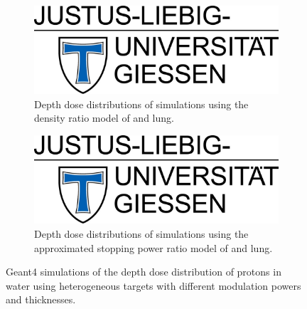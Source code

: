 \documentclass{article}
\begin{document}
\begin{figure}[h]
    \centering
    \begin{subfigure}[b]{0.49\textwidth}
        \centering
        \includegraphics[width=\textwidth]{fig/jlu.png}
        \caption{Depth dose distributions of simulations using the density ratio model of  and lung.}
        \label{fig:sim1}
    \end{subfigure}
    \hfill
    \begin{subfigure}[b]{0.49\textwidth}
        \centering
        \includegraphics[width=\textwidth]{fig/jlu.png}
        \caption{Depth dose distributions of simulations using the approximated stopping power ratio model of  and lung.}
        \label{fig:sim2}
    \end{subfigure}
    \caption{Geant4 simulations of the depth dose distribution of protons in water using heterogeneous targets with different modulation powers and thicknesses. }
    \label{fig:sim}
\end{figure}

\pagebreak
\end{document}
